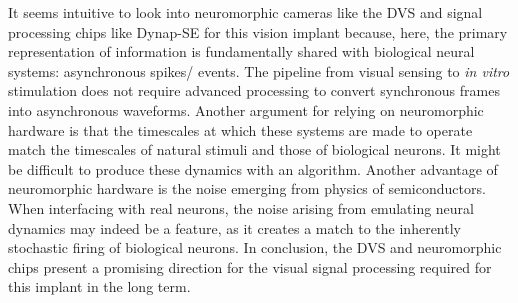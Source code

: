 \documentclass[8pt]{beamer}
\begin{document}
\begin{small}
	It seems intuitive to look into neuromorphic cameras like the
	DVS and signal processing chips like Dynap-SE for this vision implant
	because, here, the primary representation of information is fundamentally
	shared with biological neural systems: asynchronous spikes/ events. The
	pipeline from visual sensing to \textit{in vitro} stimulation does not
	require advanced processing to convert synchronous frames into asynchronous
	waveforms. Another argument for relying on neuromorphic hardware is that the
	timescales at which these systems are made to operate match the timescales
	of natural stimuli and those of biological neurons. It might be difficult to
	produce these dynamics with an algorithm. Another advantage of neuromorphic
	hardware is the noise emerging from physics of semiconductors. When
	interfacing with real neurons, the noise arising from emulating neural
	dynamics may indeed be a feature, as it creates a match to the inherently
	stochastic firing of biological neurons. In conclusion, the DVS and
	neuromorphic chips present a promising direction for the visual signal
	processing required for this implant in the long term. \\
	

\end{small}
\end{document}
